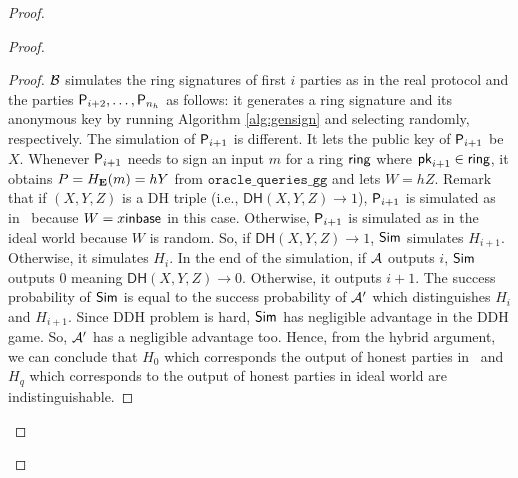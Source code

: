 \begin{proof}
\begin{proof}
\begin{proof}
			
			$\mathcal{B} $ simulates the ring signatures of first $ i $ parties as in the real protocol and the parties $ \mathsf{P}_{i+2}, \ldots, \mathsf{P}_{n_h} $ as follows: it generates a ring signature and its anonymous key by running Algorithm \ref{alg:gensign} and selecting randomly, respectively. The simulation of $ \mathsf{P}_{i + 1} $ is different. It lets the public key of $ \mathsf{P}_{i + 1} $ be $ X$. Whenever $ \mathsf{P}_{i+1} $ needs to sign an input $ m$ for a ring $ \mathsf{ring} $ where $ \mathsf{pk}_{i+1} \in \mathsf{ring}$, it obtains $ P = H_{\mathbf{E}}(m) = hY $ from $ \mathtt{oracle\_queries\_gg} $ and lets $ W = hZ $. Remark that if $ (X,Y,Z)$ is a DH triple (i.e., $  \mathsf{DH}(X,Y,Z) \rightarrow 1 $), $ \mathsf{P}_{i+1} $ is simulated as in \name \ because $ W = x{\mathsf{inbase}}$ in this case. Otherwise, $ \mathsf{P}_{i+1} $ is simulated as in the ideal world because $ W $ is random. So, if $  \mathsf{DH}(X,Y,Z)  \rightarrow 1$, $\mathsf{Sim} $ simulates $ H_{i+1} $. Otherwise, it simulates $ H_{i} $. In the end of the simulation, if $ \mathcal{A} $ outputs $ i $, $\mathsf{Sim} $ outputs $ 0 $ meaning $  \mathsf{DH}(X,Y,Z) \rightarrow 0$. Otherwise, it outputs $ i + 1 $. The success probability of $\mathsf{Sim} $ is equal to the success probability of $ \mathcal{A}' $ which distinguishes $ H_i $ and $ H_{i +1} $. Since DDH problem is hard, $\mathsf{Sim} $ has negligible advantage in the DDH game. So, $ \mathcal{A}' $ has a negligible advantage too. Hence, from the hybrid argument, we can conclude that $ H_0    $ which corresponds the output of honest parties in  \name\ and $ H_q  $ which corresponds to  the output of honest parties in ideal world are indistinguishable.
			

\end{proof}
\end{proof}
\end{proof}
